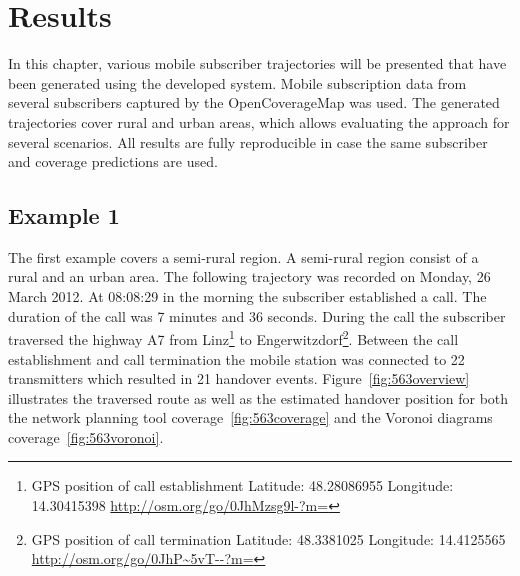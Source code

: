 \chapter{Results}
In this chapter, various mobile subscriber trajectories will be presented that have been generated using the developed system. Mobile subscription data from several subscribers captured by the OpenCoverageMap was used. The generated trajectories cover rural and urban areas, which allows evaluating the approach for several scenarios. All results are fully reproducible in case the same subscriber and coverage predictions are used.
\section{Example 1}
The first example covers a semi-rural region. A semi-rural region consist of a rural and an urban area. The following trajectory was recorded on Monday, 26 March 2012. At 08:08:29 in the morning the subscriber established a call. The duration of the call was 7 minutes and 36 seconds.  During the call the subscriber traversed the highway A7 from Linz\footnote{GPS position of call establishment Latitude: 48.28086955 Longitude:	14.30415398 \url{http://osm.org/go/0JhMzsg9l-?m=}} to Engerwitzdorf\footnote{GPS position of call termination Latitude: 48.3381025 Longitude:	14.4125565 \url{http://osm.org/go/0JhP~5vT--?m=}}. Between the call establishment and call termination the mobile station was connected to 22 transmitters which resulted in 21 handover events. Figure~\ref{fig:563overview} illustrates the traversed route as well as the estimated handover position for both the network planning tool coverage~\ref{fig:563coverage} and the Voronoi diagrams coverage~\ref{fig:563voronoi}.




